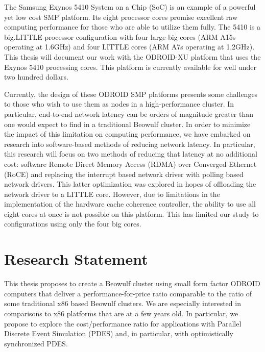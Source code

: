 \documentclass[11pt]{book}
\begin{document}
The Samsung Exynos 5410 System on a Chip (SoC) is an example of a powerful yet low cost
SMP platform.  Its eight processor cores promise excellent raw computing performance for
those who are able to utilize them fully.  The 5410 is a big.LITTLE processor
configuration with four large big cores (ARM A15s operating at 1.6GHz) and four LITTLE
cores (ARM A7s operating at 1.2GHz).  This thesis will document our work with the
ODROID-XU platform that uses the Exynos 5410 processing cores.  This platform is currently
available for well under two hundred dollars.

Currently, the design of these ODROID SMP platforms presents some challenges to those who
wish to use them as nodes in a high-performance cluster.  In particular, end-to-end
network latency can be orders of magnitude greater than one would expect to find in a
traditional Beowulf cluster.  In order to minimize the impact of this limitation on
computing performance, we have embarked on research into software-based methods of
reducing network latency.  In particular, this research will focus on two methods of
reducing that latency at no additional cost: software Remote Direct Memory Access (RDMA)
over Converged Ethernet (RoCE) and replacing the interrupt based network driver with
polling based network drivers.  This latter optimization was explored in hopes of
offloading the network driver to a LITTLE core.  However, due to limitations in the
implementation of the hardware cache coherence controller, the ability to use all eight
cores at once is not possible on this platform.  This has limited our study to
configurations using only the four big cores.

\section{Research Statement}

This thesis proposes to create a Beowulf cluster using small form factor ODROID computers
that deliver a performance-for-price ratio comparable to the ratio of some traditional x86
based Beowulf clusters.  We are especially interested in comparisons to x86 platforms that
are at a few years old.  In particular, we propose to explore the cost/performance ratio
for applications with Parallel Discrete Event Simulation (PDES) and, in particular, with
optimistically synchronized \cite{fujimoto-90,jefferson-85} PDES.
\end{document}
